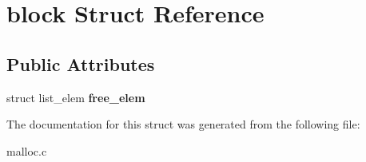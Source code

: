 \hypertarget{structblock}{}\section{block Struct Reference}
\label{structblock}
\subsection*{Public Attributes}
\begin{DoxyCompactItemize}
\item 
struct list\+\_\+elem {\bfseries free\+\_\+elem}\hypertarget{structblock_aeb1e367fcd8d93b045459618add975d2}{}\label{structblock_aeb1e367fcd8d93b045459618add975d2}

\end{DoxyCompactItemize}


The documentation for this struct was generated from the following file\+:\begin{DoxyCompactItemize}
\item 
malloc.\+c\end{DoxyCompactItemize}
